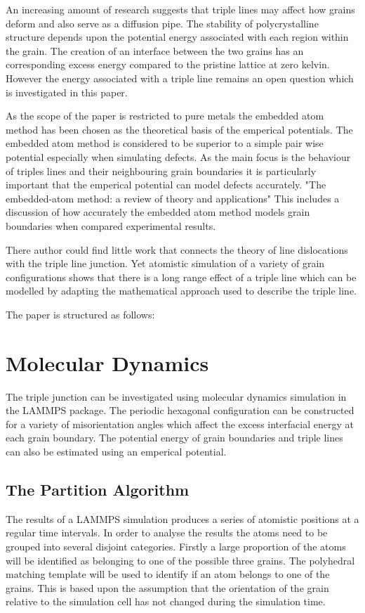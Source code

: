 \documentclass[12pt,a4paper]{book}
\begin{document}
An increasing amount of research suggests that triple lines may affect how  grains deform and also serve as a diffusion pipe. The stability of polycrystalline structure depends upon the potential energy associated with each region within the grain. The creation of an interface between the two grains has an corresponding excess energy compared to the pristine lattice at zero kelvin. However the energy associated with a triple line remains an open question which is investigated in this paper.

As the scope of the paper is restricted to pure metals the embedded atom method has been chosen as the theoretical basis of the emperical potentials. The embedded atom method is considered to be superior to a simple pair wise potential especially when simulating defects. As the main focus is the behaviour of triples lines and their neighbouring grain boundaries it is particularly important that the emperical potential can model defects accurately. "The embedded-atom method:
a review of theory and applications" This includes a discussion of how accurately the embedded atom method models grain boundaries when compared  experimental results.

There author could find little work that connects the theory of line dislocations with the triple line junction. Yet atomistic simulation of a variety of grain configurations shows that there is a long range effect of a triple line which can be modelled by adapting the mathematical approach used to describe the triple line.  

The paper is structured as follows:

 


\chapter{Molecular Dynamics}
The triple junction can be investigated using molecular dynamics simulation in the LAMMPS package. The periodic hexagonal configuration can be constructed for a variety of misorientation angles which affect the excess interfacial energy at each grain boundary. The potential energy of grain boundaries and triple lines can also be estimated using an emperical potential.
\section{The Partition Algorithm}
The results of a LAMMPS simulation produces a series of atomistic positions at a regular time intervals. In order to analyse the results the atoms need to be grouped into several disjoint categories. Firstly a large proportion of the atoms will be identified as belonging to one of the possible three grains. The polyhedral matching template will be used to identify if an atom belongs to one of the grains. This is based upon the assumption that the orientation of the grain relative to the simulation cell has not changed during the simulation time. 
\end{document}
